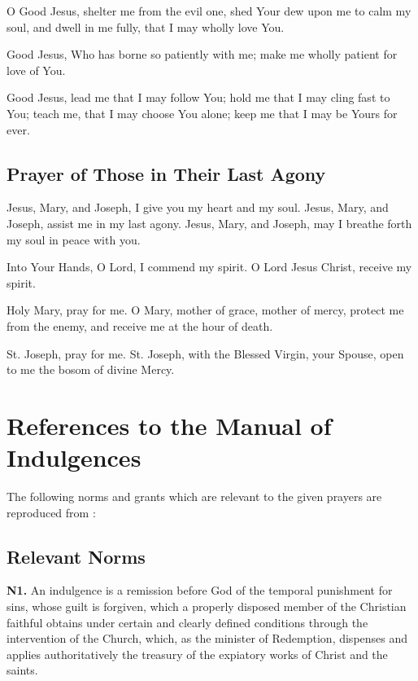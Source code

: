 \documentclass[12pt]{article}
\newif\ifxetexorluatex
\newcommand{\prayertitle}[1]{\subsection{#1}}
\newcommand{\sectionsign}{%
	\ifxetexorluatex%
		{\setmainfont{Times New Roman}§}%
	\else%
		§
	\fi
}
\begin{document}
O Good Jesus, shelter me from the evil one, shed Your dew upon me to calm my soul, and dwell in me fully, that I may wholly love You.

Good Jesus, Who has borne so patiently with me;
make me wholly patient for love of You.

Good Jesus, lead me that I may follow You; hold me that I may cling fast to You;
teach me, that I may choose You alone; keep me that I may be Yours for ever.

\prayertitle{Prayer of Those in Their Last Agony}
Jesus, Mary, and Joseph, I give you my heart and my soul.
Jesus, Mary, and Joseph, assist me in my last agony.
Jesus, Mary, and Joseph, may I breathe forth my soul in peace with you.

Into Your Hands, O Lord, I commend my spirit.
O Lord Jesus Christ, receive my spirit.

Holy Mary, pray for me.
O Mary, mother of grace, mother of mercy, protect me from the enemy, and receive me at the hour of death.

St. Joseph, pray for me.
St. Joseph, with the Blessed Virgin, your Spouse, open to me the bosom of divine Mercy.


\newpage
\appendix
\section{References to the Manual of Indulgences}
The following norms and grants which are relevant to the given prayers are reproduced from :
\subsection{Relevant Norms}
\newcommand{\norm}[1]{\textbf{N#1.}\newline}
\newcommand{\subnorm}[1]{\sectionsign{}#1.}
\norm{1}
An indulgence is a remission before God of the temporal punishment for sins, whose guilt is forgiven, which a properly disposed member of the Christian faithful obtains under certain and clearly defined conditions through the intervention of the Church, which, as the minister of Redemption, dispenses and applies authoritatively the treasury of the expiatory works of Christ and the saints.
\end{document}

